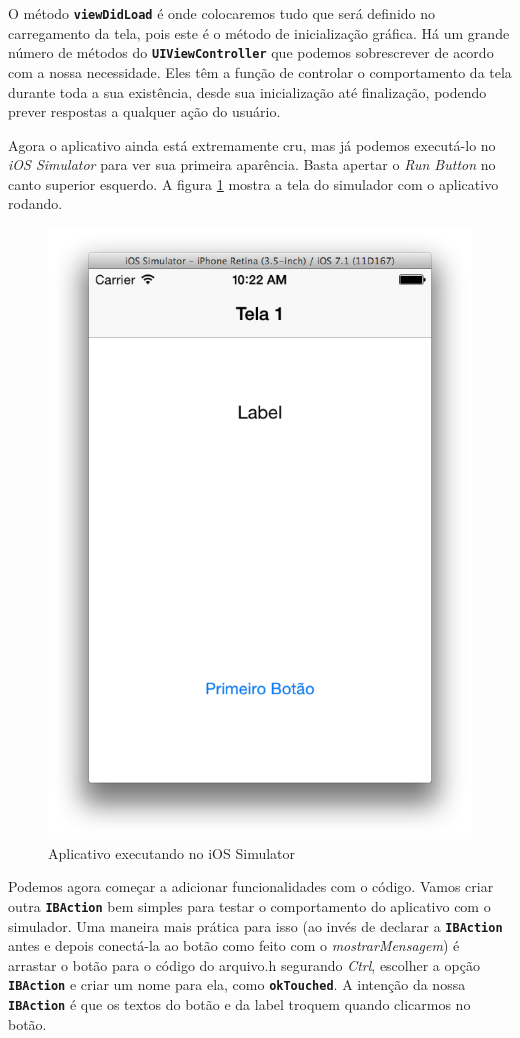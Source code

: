 \documentclass[a4paper,12pt,brazil,doubleside]{book}
\begin{document}
\begin{singlespace}
O método \texttt{\textbf{viewDidLoad}} é onde colocaremos tudo que será definido no carregamento da tela, pois este é o método de inicialização gráfica. Há um grande número de métodos do \texttt{\textbf{UIViewController}} que podemos sobrescrever de acordo com a nossa necessidade. Eles têm a função de controlar o comportamento da tela durante toda a sua existência, desde sua inicialização até finalização, podendo prever respostas a qualquer ação do usuário.

Agora o aplicativo ainda está extremamente cru, mas já podemos executá-lo no \emph{iOS Simulator} para ver sua primeira aparência. Basta apertar o \emph{Run Button} no canto superior esquerdo. A figura \ref{fig:app_executanto1} mostra a tela do simulador com o aplicativo rodando.

\bigskip
\bigskip

\begin{figure}[H]
  \centering
  \includegraphics[width=.55\textwidth]{figuras/3/tela_novo_projeto_26.png}
  \caption{Aplicativo executando no iOS Simulator}
  \label{fig:app_executanto1}
\end{figure}

\bigskip


Podemos agora começar a adicionar funcionalidades com o código. Vamos criar outra \texttt{\textbf{IBAction}} bem simples para testar o comportamento do aplicativo com o simulador. Uma maneira mais prática para isso (ao invés de declarar a \texttt{\textbf{IBAction}} antes e depois conectá-la ao botão como feito com o \emph{mostrarMensagem}) é arrastar o botão para o código do arquivo.h segurando \emph{Ctrl}, escolher a opção \texttt{\textbf{IBAction}} e criar um nome para ela, como \texttt{\textbf{okTouched}}. A intenção da nossa \texttt{\textbf{IBAction}} é que os textos do botão e da label troquem quando clicarmos no botão.


\end{singlespace}
\end{document}
